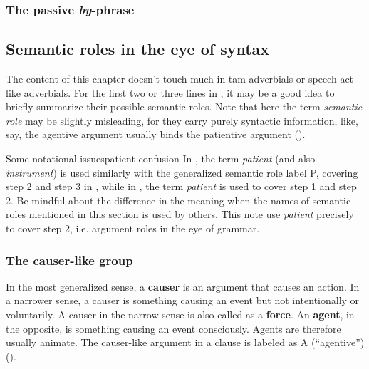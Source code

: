 \documentclass[UTF8, a4paper, oneside, scheme=plain]{ctexrep}
\newcommand*{\citepage}[1]{p.~{#1}}
\newcommand*{\concept}[1]{\textbf{#1}}
\newcommand*{\term}[1]{\emph{#1}}
\newcommand{\corpus}[1]{\emph{#1}}
\begin{document}
\subsubsection{The passive \corpus{by}-phrase}\label{sec:valency.overview.by-phrase}

\subsection{Semantic roles in the eye of syntax}\label{sec:valency.overview.semantic-roles}

The content of this chapter doesn't touch much in \acs{tam} adverbials or speech-act-like adverbials.
For the first two or three lines in ,
it may be a good idea to briefly summarize their possible semantic roles.
Note that here the term \term{semantic role} may be slightly misleading,
for they carry purely syntactic information, 
like, say, the agentive argument usually binds the patientive argument 
().

\begin{infobox}{Some notational issues}{patient-confusion}
    In \citet[\citepage{111}]{dixon2005semantic}, 
    the term \term{patient} (and also \term{instrument}) 
    is used similarly with the generalized semantic role label P,
    covering step 2 and step 3 in ,
    while in \citet[\citepage{50}]{payne1997describing},
    the term \term{patient} is used to cover step 1 and step 2.
    Be mindful about the difference in the meaning 
    when the names of semantic roles mentioned in this section is used by others.
    This note use \term{patient} precisely to cover step 2, 
    i.e. argument roles in the eye of grammar.
\end{infobox}

\subsubsection{The causer-like group}

In the most generalized sense,
a \concept{causer} is an argument that causes an action. 
In a narrower sense, a causer is something causing an event but not intentionally or voluntarily.
A causer in the narrow sense is also called as a \concept{force}.
An \concept{agent}, in the opposite, is something causing an event consciously.
Agents are therefore usually animate.
The causer-like argument in a clause is labeled as A (``agentive'')
().
\end{document}
